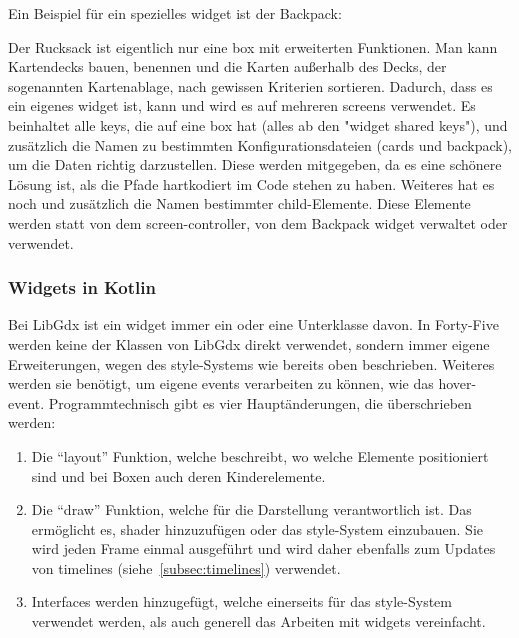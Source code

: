 Ein Beispiel für ein spezielles widget ist der Backpack:
Der Rucksack ist eigentlich nur eine box mit erweiterten Funktionen.
Man kann Kartendecks bauen, benennen und die Karten außerhalb des Decks, der sogenannten Kartenablage, nach gewissen Kriterien sortieren.
Dadurch, dass es ein eigenes widget ist, kann und wird es auf mehreren screens verwendet.
Es beinhaltet alle keys, die auf eine box hat (alles ab den "widget shared keys"), und zusätzlich die Namen zu bestimmten Konfigurationsdateien (cards und backpack), um die Daten richtig darzustellen.
Diese werden mitgegeben, da es eine schönere Lösung ist, als die Pfade hartkodiert im Code stehen zu haben.
Weiteres hat es noch und zusätzlich die Namen bestimmter child-Elemente.
Diese Elemente werden statt von dem screen-controller, von dem Backpack widget verwaltet oder verwendet.

\renewcommand{\kapitelautor}{Autor: Felix Zwickelstorfer}
\subsubsection{Widgets in Kotlin}\label{subsubsec:widgetsinkotlin}
\renewcommand{\kapitelautor}{Autor: Felix Zwickelstorfer}
Bei LibGdx ist ein widget immer ein  oder eine Unterklasse davon.
In Forty-Five werden keine der Klassen von LibGdx direkt verwendet, sondern immer eigene Erweiterungen, wegen des style-Systems wie bereits oben beschrieben.
Weiteres werden sie benötigt, um eigene events verarbeiten zu können, wie das hover-event.
Programmtechnisch gibt es vier Hauptänderungen, die überschrieben werden:
\begin{enumerate}
    \item Die ``layout'' Funktion, welche beschreibt, wo welche Elemente positioniert sind und bei Boxen auch deren Kinderelemente.
    \item Die ``draw'' Funktion, welche für die Darstellung verantwortlich ist. Das ermöglicht es, shader hinzuzufügen oder das style-System einzubauen.
    Sie wird jeden Frame einmal ausgeführt und wird daher ebenfalls zum Updates von timelines (siehe~\ref{subsec:timelines}) verwendet.
    \item Interfaces werden hinzugefügt, welche einerseits für das style-System verwendet werden, als auch generell das Arbeiten mit widgets vereinfacht.
\end{enumerate}
\renewcommand{\kapitelautor}{Autor: Felix Zwickelstorfer}
